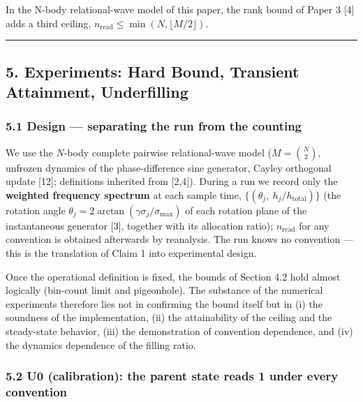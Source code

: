 \documentclass[
  a4paper,
]{article}
\begin{document}
In the N-body relational-wave model of this paper, the rank bound of
Paper 3 {[}4{]} adds a third ceiling,
\(n_{\mathrm{read}}\le\min(N,\lfloor M/2\rfloor)\).

\begin{center}\rule{0.5\linewidth}{0.5pt}\end{center}

\subsection{5. Experiments: Hard Bound, Transient Attainment,
Underfilling}\label{experiments-hard-bound-transient-attainment-underfilling}

\subsubsection{5.1 Design --- separating the run from the
counting}\label{design-separating-the-run-from-the-counting}

We use the \(N\)-body complete pairwise relational-wave model
(\(M=\binom N2\), unfrozen dynamics of the phase-difference sine
generator, Cayley orthogonal update {[}12{]}; definitions inherited from
{[}2,4{]}). During a run we record only the \textbf{weighted frequency
spectrum} at each sample time,
\(\{(\theta_j,\ h_j/h_{\mathrm{total}})\}\) (the rotation angle
\(\theta_j=2\arctan(\gamma\sigma_j/\sigma_{\max})\) of each rotation
plane of the instantaneous generator {[}3{]}, together with its
allocation ratio); \(n_{\mathrm{read}}\) for any convention is obtained
afterwards by reanalysis. The run knows no convention --- this is the
translation of Claim 1 into experimental design.

Once the operational definition is fixed, the bounds of Section 4.2 hold
almost logically (bin-count limit and pigeonhole). The substance of the
numerical experiments therefore lies not in confirming the bound itself
but in (i) the soundness of the implementation, (ii) the attainability
of the ceiling and the steady-state behavior, (iii) the demonstration of
convention dependence, and (iv) the dynamics dependence of the filling
ratio.

\subsubsection{5.2 U0 (calibration): the parent state reads 1 under
every
convention}\label{u0-calibration-the-parent-state-reads-1-under-every-convention}
\end{document}
